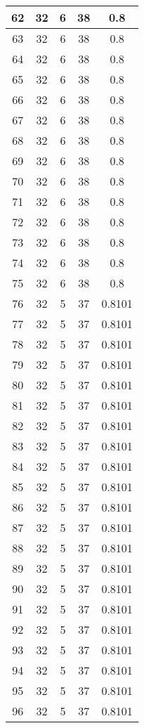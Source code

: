 \documentclass[letterpaper, 12pt]{article}
\begin{document}
\begin{longtable}{|c|c|c|c|c|}
\hline
62 & 32 & 6 & 38 & 0.8 \\
\hline
63 & 32 & 6 & 38 & 0.8 \\
\hline
64 & 32 & 6 & 38 & 0.8 \\
\hline
65 & 32 & 6 & 38 & 0.8 \\
\hline
66 & 32 & 6 & 38 & 0.8 \\
\hline
67 & 32 & 6 & 38 & 0.8 \\
\hline
68 & 32 & 6 & 38 & 0.8 \\
\hline
69 & 32 & 6 & 38 & 0.8 \\
\hline
70 & 32 & 6 & 38 & 0.8 \\
\hline
71 & 32 & 6 & 38 & 0.8 \\
\hline
72 & 32 & 6 & 38 & 0.8 \\
\hline
73 & 32 & 6 & 38 & 0.8 \\
\hline
74 & 32 & 6 & 38 & 0.8 \\
\hline
75 & 32 & 6 & 38 & 0.8 \\
\hline
76 & 32 & 5 & 37 & 0.8101 \\
\hline
77 & 32 & 5 & 37 & 0.8101 \\
\hline
78 & 32 & 5 & 37 & 0.8101 \\
\hline
79 & 32 & 5 & 37 & 0.8101 \\
\hline
80 & 32 & 5 & 37 & 0.8101 \\
\hline
81 & 32 & 5 & 37 & 0.8101 \\
\hline
82 & 32 & 5 & 37 & 0.8101 \\
\hline
83 & 32 & 5 & 37 & 0.8101 \\
\hline
84 & 32 & 5 & 37 & 0.8101 \\
\hline
85 & 32 & 5 & 37 & 0.8101 \\
\hline
86 & 32 & 5 & 37 & 0.8101 \\
\hline
87 & 32 & 5 & 37 & 0.8101 \\
\hline
88 & 32 & 5 & 37 & 0.8101 \\
\hline
89 & 32 & 5 & 37 & 0.8101 \\
\hline
90 & 32 & 5 & 37 & 0.8101 \\
\hline
91 & 32 & 5 & 37 & 0.8101 \\
\hline
92 & 32 & 5 & 37 & 0.8101 \\
\hline
93 & 32 & 5 & 37 & 0.8101 \\
\hline
94 & 32 & 5 & 37 & 0.8101 \\
\hline
95 & 32 & 5 & 37 & 0.8101 \\
\hline
96 & 32 & 5 & 37 & 0.8101 \\

\end{longtable}
\end{document}
